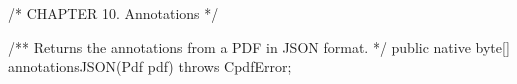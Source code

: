 /* CHAPTER 10. Annotations */

/** Returns the annotations from a PDF in JSON format. */
public native byte[] annotationsJSON(Pdf pdf) throws CpdfError;
